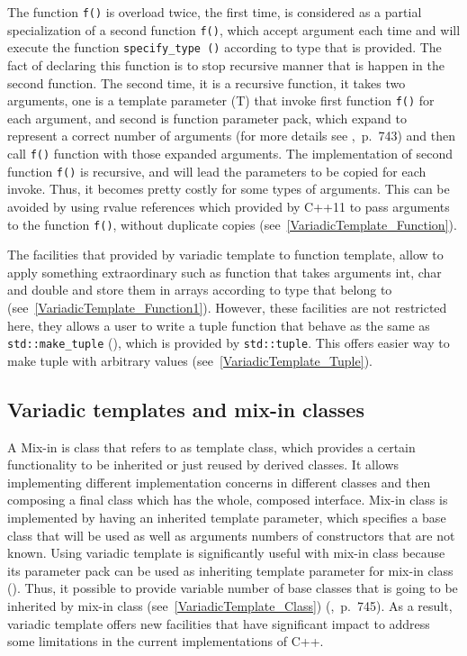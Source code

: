 \documentclass[11pt]{report}
\begin{document}
The function \texttt{f()} is overload twice, the first time, is considered as a partial specialization of a second function \texttt{f()}, which accept argument each time and will execute the function \texttt{specify\_type~()} according to type that is provided.  The fact of declaring this function is to stop recursive manner that is happen in the second function. The second time, it is a recursive function, it takes two arguments, one is a template parameter (T) that invoke first function \texttt{f()} for each argument, and second is function parameter pack, which expand to represent a correct number of arguments (for more details see \cite{Gregorie:professionalcpp},~p.~743) and then call \texttt{f()} function with those expanded arguments. The implementation of second function \texttt{f()} is recursive, and will lead the parameters to be copied for each invoke. Thus, it becomes pretty costly for some types of arguments. This can be avoided by using rvalue references which provided by C++11 to pass arguments to the function \texttt{f()}, without duplicate copies (see~\ref{VariadicTemplate_Function}).


The facilities that provided by variadic template to function template, allow to apply something extraordinary such as function that takes arguments int, char and double and store them in arrays according to type that belong to (see~\ref{VariadicTemplate_Function1}). However, these facilities are not restricted here, they allows a user to write a tuple function that behave as the same as \texttt{std::make\_tuple} (\cite{Stroustrup:2012:Cpp11}), which is provided by \texttt{std::tuple}. This offers easier way to make tuple with arbitrary values (see~\ref{VariadicTemplate_Tuple}).


\subsection{Variadic templates and mix-in classes}
\label{subsection: Variadic Templates and Mix-In Classes}
A Mix-in is class that refers to as template class, which provides a certain functionality to be inherited or just reused by derived classes. It allows implementing different implementation concerns in different classes and then composing a final class which has the whole, composed interface. Mix-in class is implemented by having an inherited template parameter, which specifies a base class that will be used as well as arguments numbers of constructors that are not known. Using variadic template is significantly useful with mix-in class because its parameter pack can be used as inheriting template parameter for mix-in class (\cite{Gregor:2007:VTC}). Thus, it possible to provide variable number of base classes that is going to be inherited by mix-in class (see~\ref{VariadicTemplate_Class}) (\cite{Gregorie:professionalcpp},~p.~745). As a result, variadic template offers new facilities that have significant impact to address some limitations in the current implementations of C++.
\end{document}
